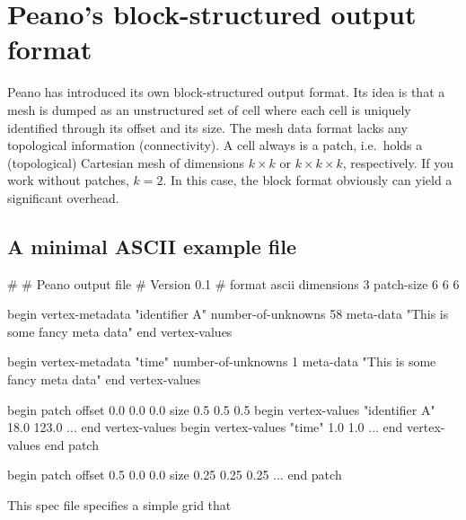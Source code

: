 \chapter{Peano's block-structured output format}
\label{capter:blockstructured-output-format}


Peano has introduced its own block-structured output format.
Its idea is that a mesh is dumped as an unstructured set of cell where each cell
is uniquely identified through its offset and its size. 
The mesh data format lacks any topological information (connectivity).
A cell always is a patch, i.e.~holds a (topological) Cartesian mesh of
dimensions $k \times k$ or $k \times k \times k $, respectively.
If you work without patches, $k=2$. 
In this case, the block format obviously can yield a significant overhead.



\section{A minimal ASCII example file}
\begin{code}
#
# Peano output file
# Version 0.1
#
format ascii
dimensions 3
patch-size 6 6 6

begin vertex-metadata "identifier A"
  number-of-unknowns 58
  meta-data "This is some fancy meta data"  
end vertex-values

begin vertex-metadata "time"
  number-of-unknowns 1
  meta-data "This is some fancy meta data"  
end vertex-values

begin patch
  offset 0.0 0.0 0.0
  size   0.5 0.5 0.5
  begin vertex-values "identifier A"
    18.0 123.0 ...
  end vertex-values
  begin vertex-values "time"
    1.0 1.0 ...
  end vertex-values
end patch 

begin patch
  offset 0.5 0.0 0.0
  size   0.25 0.25 0.25
  ...
end patch 
\end{code}

\noindent
This spec file specifies a simple grid that

